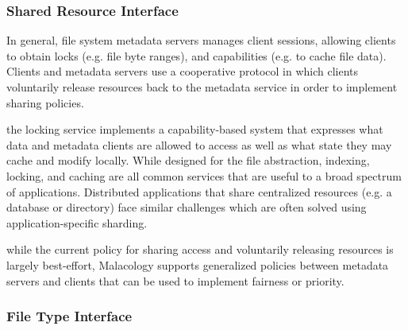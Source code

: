 
\subsubsection{Shared Resource Interface}
\label{sec:shared-resource-interface}

In general, file system metadata servers manages client sessions, allowing
clients to obtain locks (e.g. file byte ranges), and capabilities (e.g. to
cache file data). Clients and metadata servers use a cooperative protocol in
which clients voluntarily release resources back to the  metadata service in order to implement sharing policies.

the locking service implements a capability-based system that expresses what
data and  metadata clients are allowed to access as
well as what state they may cache and modify locally.  While designed for the
file abstraction, indexing, locking, and caching are all common services that
are useful to a broad spectrum of applications.  Distributed applications that
share centralized resources (e.g. a database or directory) face similar
challenges which are often solved using application-specific sharding.

 while the current policy
for sharing access and voluntarily releasing resources is largely best-effort,
Malacology supports generalized policies between metadata servers and clients
that can be used to implement fairness or priority.


\subsubsection{File Type Interface}
\label{sec:file-type-interface}

